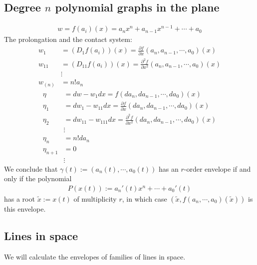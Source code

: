 \documentclass[12pt]{article}
\numberwithin{equation}{section}
\theoremstyle{plain}
\theoremstyle{definition}
\begin{document}
\subsection{Degree $n$ polynomial graphs in the plane}
\begin{align*}
w=f(a_{i})(x)=a_{n}x^{n}+a_{n-1}x^{n-1}+\cdots+a_{0}
\end{align*}
The prolongation and the contact system:
\begin{align*}
w_{1}&=(D_{1}f(a_{i}))(x)=\frac{\partial f}{\partial x}(a_n,a_{n-1},\cdots,a_{0})(x)\\
w_{11}&=(D_{11}f(a_{i}))(x)=\frac{\partial^{2}f}{\partial x^{2}}(a_n,a_{n-1},\cdots,a_{0})(x)\\
&\vdots\\
w_{(n)}&=n!a_{n}
\end{align*}
\begin{align*}
\eta&=dw-w_{1}dx=f(da_{n},da_{n-1},\cdots,da_{0})(x)\\
\eta_{1}&=dw_{1}-w_{11}dx=\frac{\partial f}{\partial x}(da_{n},da_{n-1},\cdots,da_{0})(x) \\
\eta_{2}&=dw_{11}-w_{111}dx=\frac{\partial^{2} f}{\partial x^{2}}(da_{n},da_{n-1},\cdots,da_{0})(x)\\
&\vdots\\
\eta_{n}&=n!da_{n}\\
\eta_{n+1}&=0\\
&\vdots
\end{align*}
We conclude that $\gamma(t):=(a_{n}(t),\cdots,a_{0}(t))$ has an $r$-order envelope if and only if the polynomial
\begin{align*}
P(x(t)):=a_{n}'(t)x^{n}+\cdots+a_{0}'(t)
\end{align*}
has a root $\tilde{x}:=x(t)$ of multiplicity $r$, in which case $(\tilde{x},f(a_{n},\cdots,a_{0})(\tilde{x}))$ is this envelope.

\subsection{Lines in space}
We will calculate the envelopes of families of lines in space.
\end{document}
